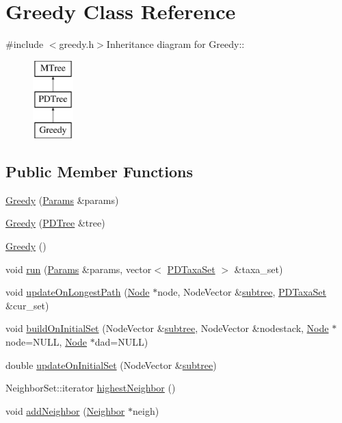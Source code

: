 \hypertarget{classGreedy}{
\section{Greedy Class Reference}
\label{classGreedy}
}


{\ttfamily \#include $<$greedy.h$>$}Inheritance diagram for Greedy::\begin{figure}[H]
\begin{center}
\leavevmode
\includegraphics[height=3cm]{classGreedy}
\end{center}
\end{figure}
\subsection*{Public Member Functions}
\begin{DoxyCompactItemize}
\item 
\hyperlink{classGreedy_a1aeec7fbb70ebb2abe0fcb97f21995d8}{Greedy} (\hyperlink{structParams}{Params} \&params)
\item 
\hyperlink{classGreedy_ab5f9558f6a84338ab866c11bffa934cc}{Greedy} (\hyperlink{classPDTree}{PDTree} \&tree)
\item 
\hyperlink{classGreedy_a916c0ab051f780c4d3ccec06f44bbf6c}{Greedy} ()
\item 
void \hyperlink{classGreedy_a9e5abfe8869f9e6695f77748d6fe5e51}{run} (\hyperlink{structParams}{Params} \&params, vector$<$ \hyperlink{classPDTaxaSet}{PDTaxaSet} $>$ \&taxa\_\-set)
\item 
void \hyperlink{classGreedy_a933a3b9c40efec6d2643092baccf6b7f}{updateOnLongestPath} (\hyperlink{classNode}{Node} $\ast$node, NodeVector \&\hyperlink{classGreedy_ac7f2cff520d775503d290e236fce8baf}{subtree}, \hyperlink{classPDTaxaSet}{PDTaxaSet} \&cur\_\-set)
\item 
void \hyperlink{classGreedy_a52d592f837f77cd51b39b8f4c3f64e0c}{buildOnInitialSet} (NodeVector \&\hyperlink{classGreedy_ac7f2cff520d775503d290e236fce8baf}{subtree}, NodeVector \&nodestack, \hyperlink{classNode}{Node} $\ast$node=NULL, \hyperlink{classNode}{Node} $\ast$dad=NULL)
\item 
double \hyperlink{classGreedy_a0f31932ace48884fa0b6aadbd444229d}{updateOnInitialSet} (NodeVector \&\hyperlink{classGreedy_ac7f2cff520d775503d290e236fce8baf}{subtree})
\item 
NeighborSet::iterator \hyperlink{classGreedy_a6b90a3f292fcf91be8f0a156e67822f0}{highestNeighbor} ()
\item 
void \hyperlink{classGreedy_aaa333c0d2919689abfe5a439f4e41b6a}{addNeighbor} (\hyperlink{classNeighbor}{Neighbor} $\ast$neigh)
\end{DoxyCompactItemize}
